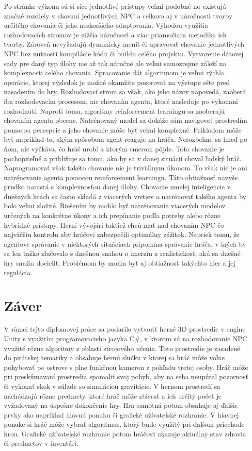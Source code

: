 \documentclass[slovak, master]{diploma}
\begin{document}
Po stránke výkonu sú si síce jednotlivé prístupy veľmi podobné no existujú značné rozdiely v chovaní jednotlivých NPC a celkovo aj v náročnosti tvorby určitého chovania či jeho neskoršieho adaptovania. Výhodou využitia rozhodovacích stromov je nižšia náročnosť a viac priamočiara metodika ich tvorby. Zároveň nevyžadujú dynamicky meniť či upravovať chovanie jednotlivých NPC bez nutnosti kompilácie kódu či buildu celého projektu. Vytvorenie dátovej sady pre daný typ úlohy nie až tak náročné ale veľmi samozrejme záleží na komplexnosti celého chovania. Spracovanie dát algoritmom je veľmi rýchla operácie, ktorej výsledok je možné okamžite pozorovať na výstupe ešte pred nasadením do hry. Rozhodovací strom sa však, ako jeho názov napovedá, zaoberá iba rozhodovacím procesom, nie chovaním agenta, ktoré nasleduje po vykonaní rozhodnutí. Naproti tomu, algoritmy reinforcement learningu sa zaoberajú chovaním agenta obecne. Natrénovaný model sa dokáže sám navigovať prostredím pomocou percepcie a jeho chovanie môže byť veľmi komplexné. Príkladom môže byť napríklad to, akým spôsobom agent reaguje na hráča. Nerozbehne sa hneď po ňom, ale vyčkáva, čo hráč urobí a ktorým smerom pôjde. Toto chovanie je pochopiteľné a približuje sa tomu, ako by sa v danej situácií choval ľudský hráč. Naprogramovať však takéto chovanie nie je triviálnym úkonom. To však nie je ani natrénovanie agenta pomocou reinforcement learningu. Táto obtiažnosť navyše prudko narastá s komplexnosťou danej úlohy. Chovanie umelej inteligencie v dnešných hrách sa často skladá z viacerých vrstiev a natrénovať takého agenta by bolo veľmi zložité. Riešením by mohlo byť natrénovanie viacerých modelov určených na konkrétne úkony a ich prepínanie podľa potreby alebo rôzne hybridné prístupy. Herní vývojári taktiež chcú mať nad chovaním NPC čo najväčšiu kontrolu aby hráčovi zabezpečili optimálny zážitok. Napriek tomu, že agentove správanie v niektorých situáciach pripomína správanie hráča, v iných by sa len ťažko zlučovalo s dnešnou snahou o imerziu a realistickosť, akú sa dnešné hry snažia docieliť. Problémom by mohla byť aj obtiažnosť takýchto hier a jej regulácia.

\chapter{Záver}
\label{sec:Conclusion}
V rámci tejto diplomovej práce sa podarilo vytvoriť herné 3D prostredie v engine Unity s využitím programovacieho jazyka C\#, v ktorom sú na rozhodovanie NPC využité rôzne algoritmy z oblasti strojového učenia. Toto prostredie je zasadené do pirátskej tematiky a obsahuje hernú slučku v ktorej sa hráč môže voľne pohybovať po ostrove s plne funkčnou kamerou z pohľadu tretej osoby. Hráč môže pri preskúmavaní prostredia spomaliť svoj pohyb, aby na seba neupútal pozornosť či vykonať skok v súlade so simuláciou gravitácie. V hernom prostredí sa nachádzajú rôzne predmety, ktoré hráč môže zbierať a ich určitý počet je vyžadovaný na úspešne dokončenie hry. Hra samotná potom obsahuje aj ďalšie prvky ako napríklad hlavnú ponuku či grafické užívateľské rozhranie. V hlavnej ponuke si hráč môže vybrať algoritmus, ktorý bude využitý pri ďalšom priechode hrou. Grafické užívateľské rozhranie potom hráčovi ukazuje aktuálny stav zdravia či predmetov v inventári.
\end{document}
